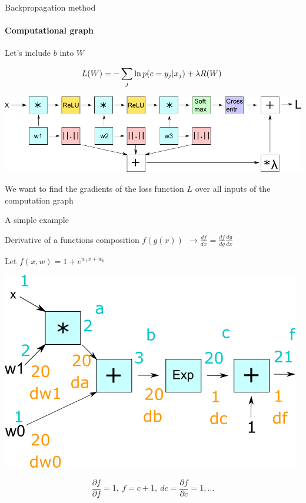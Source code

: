 \documentclass[fullscreen=true, bookmarks=true, hyperref={pdfencoding=unicode}]{beamer}
\begin{document}
\begin{frame}{Backpropagation method}
  \framesubtitle{Computational graph}

  Let's include $b$ into $W$

  $$ L(W) = - \sum\limits_j \ln p(c = y_j|x_j) + \lambda R(W) \\ \ $$

      \begin{center}
        \includegraphics[keepaspectratio, width=0.8\paperwidth]{graph_calc.png}
      \end{center}

We want to find the gradients of the loss function $L$ over all inputs of the computation graph
\end{frame}


\begin{frame}{A simple example}

Derivative of a functions composition $f(g(x))\ \ \to \frac{df}{dx} = \frac{df}{dg} \frac{dg}{dx}$

Let $f(x, w) = 1 + e^{w_1x + w_0}$

\begin{center}
  \includegraphics[keepaspectratio, width=0.5\paperwidth]{simple_graph.png}
\end{center}

$$ \frac{\partial f}{\partial f} = 1, \ f = c + 1, \ dc = \frac{\partial f}{\partial c} = 1, \dots$$    
\end{frame}
\end{document}

